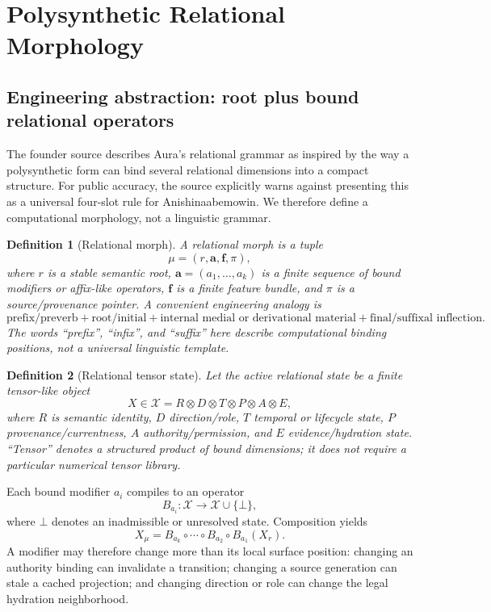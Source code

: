 \documentclass[11pt]{article}
\newtheorem{definition}{Definition}
\begin{document}
\section{Polysynthetic Relational Morphology}

\subsection{Engineering abstraction: root plus bound relational operators}

The founder source describes Aura's relational grammar as inspired by the way a
polysynthetic form can bind several relational dimensions into a compact
structure.  For public accuracy, the source explicitly warns against presenting
this as a universal four-slot rule for Anishinaabemowin.  We therefore define a
computational morphology, not a linguistic grammar.

\begin{definition}[Relational morph]
A relational morph is a tuple
\[
\mu=(r,\mathbf{a},\mathbf{f},\pi),
\]
where \(r\) is a stable semantic root, \(\mathbf{a}=(a_1,\ldots,a_k)\) is a
finite sequence of bound modifiers or affix-like operators, \(\mathbf{f}\) is a
finite feature bundle, and \(\pi\) is a source/provenance pointer.  A convenient
engineering analogy is
\[
\text{prefix/preverb} + \text{root/initial} + \text{internal medial or derivational material} +
\text{final/suffixal inflection}.
\]
The words ``prefix'', ``infix'', and ``suffix'' here describe computational
binding positions, not a universal linguistic template.
\end{definition}

\begin{definition}[Relational tensor state]
Let the active relational state be a finite tensor-like object
\[
X\in\mathcal{X}=R\otimes D\otimes T\otimes P\otimes A\otimes E,
\]
where \(R\) is semantic identity, \(D\) direction/role, \(T\) temporal or
lifecycle state, \(P\) provenance/currentness, \(A\) authority/permission, and
\(E\) evidence/hydration state.  ``Tensor'' denotes a structured product of
bound dimensions; it does not require a particular numerical tensor library.
\end{definition}

Each bound modifier \(a_i\) compiles to an operator
\[
B_{a_i}:\mathcal{X}\rightarrow\mathcal{X}\cup\{\bot\},
\]
where \(\bot\) denotes an inadmissible or unresolved state.  Composition yields
\[
X_\mu
=
B_{a_k}\circ\cdots\circ B_{a_2}\circ B_{a_1}(X_r).
\]
A modifier may therefore change more than its local surface position: changing
an authority binding can invalidate a transition; changing a source generation
can stale a cached projection; and changing direction or role can change the
legal hydration neighborhood.
\end{document}
